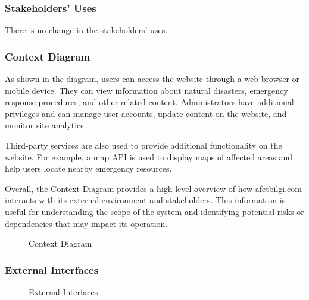 \documentclass[a4paper]{article}
\begin{document}
    \subsubsection{Stakeholders' Uses}
    There is no change in the stakeholders' uses.
    \subsubsection{Context Diagram}
    As shown in the diagram, users can access the website through a web browser or mobile device. They can view information about
    natural disasters, emergency response procedures, and other related content. Administrators have additional privileges and can
    manage user accounts, update content on the website, and monitor site analytics.

    Third-party services are also used to provide additional functionality on the website. For example, a map API is used to
    display maps of affected areas and help users locate nearby emergency resources.

    Overall, the Context Diagram provides a high-level overview of how afetbilgi.com interacts with its external environment and
    stakeholders. This information is useful for understanding the scope of the system and identifying potential risks or
    dependencies that may impact its operation.

    \begin{figure}[H] %
    
    \caption{Context Diagram}
    \end{figure}

    \subsubsection{External Interfaces}
    \begin{figure}[H]
    
    \caption{External Interfaces}
    \end{figure}


    \begin{table}[H]
    \end{table}
    \vspace{1cm}
\end{document}
